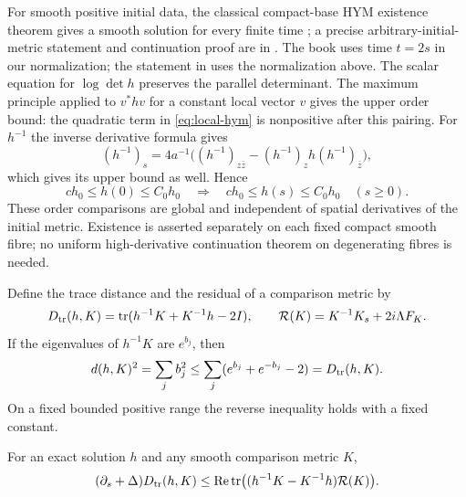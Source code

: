For smooth positive initial data, the classical compact-base HYM
existence theorem gives a smooth solution for every finite time
\cite{donaldson}; a precise arbitrary-initial-metric statement
and continuation proof are in \cite[Theorem~6.8.25]{kobayashi}.
The book uses time $t=2s$ in our normalization; the statement
in \cite[\S4.1, following (4.8)]{hkkp} uses the normalization
above. The scalar equation for $\log\det h$
preserves the parallel determinant. The maximum principle applied to
$v^*hv$ for a constant local vector $v$ gives the upper order bound:
the quadratic term in \eqref{eq:local-hym} is nonpositive after this
pairing. For $h^{-1}$ the inverse derivative formula gives
\[
 (h^{-1})_s=4a^{-1}\bigl((h^{-1})_{z\bar z}
              -(h^{-1})_z h(h^{-1})_{\bar z}\bigr),
\]
which gives its upper bound as well. Hence
\begin{equation}\label{eq:order-bounds}
 ch_0\le h(0)\le C_0h_0
 \quad\Longrightarrow\quad
 ch_0\le h(s)\le C_0h_0\quad(s\ge0).
\end{equation}
These order comparisons are global and independent of spatial
derivatives of the initial metric. Existence is asserted separately
on each fixed compact smooth fibre; no uniform high-derivative
continuation theorem on degenerating fibres is needed.

Define the trace distance and the residual of a comparison metric by
\begin{equation}\label{eq:trace-residual}
 D_{\operatorname{tr}}(h,K)=\operatorname{tr}(h^{-1}K+K^{-1}h-2I),
 \qquad
 \mathcal R(K)=K^{-1}K_s+2i\Lambda F_K.
\end{equation}
If the eigenvalues of $h^{-1}K$ are $e^{b_j}$, then
\begin{equation}\label{eq:distance-trace}
 d(h,K)^2=\sum_j b_j^2
       \le\sum_j(e^{b_j}+e^{-b_j}-2)=D_{\operatorname{tr}}(h,K).
\end{equation}
On a fixed bounded positive range the reverse inequality holds with
a fixed constant.

\begin{lemma}\label{lem:forced-trace}
For an exact solution $h$ and any smooth comparison metric $K$,
\begin{equation}\label{eq:forced-trace}
 (\partial_s+\Delta)D_{\operatorname{tr}}(h,K)
 \le\operatorname{Re}\operatorname{tr}\bigl((h^{-1}K-K^{-1}h)\mathcal R(K)\bigr).
\end{equation}
\end{lemma}

